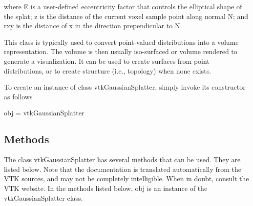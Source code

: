 where E is a user-\/defined eccentricity factor that controls the elliptical shape of the splat; z is the distance of the current voxel sample point along normal N; and rxy is the distance of x in the direction prependicular to N.

This class is typically used to convert point-\/valued distributions into a volume representation. The volume is then usually iso-\/surfaced or volume rendered to generate a visualization. It can be used to create surfaces from point distributions, or to create structure (i.\-e., topology) when none exists.

To create an instance of class vtk\-Gaussian\-Splatter, simply invoke its constructor as follows \begin{DoxyVerb}  obj = vtkGaussianSplatter
\end{DoxyVerb}
 \hypertarget{vtkwidgets_vtkxyplotwidget_Methods}{}\subsection{Methods}\label{vtkwidgets_vtkxyplotwidget_Methods}
The class vtk\-Gaussian\-Splatter has several methods that can be used. They are listed below. Note that the documentation is translated automatically from the V\-T\-K sources, and may not be completely intelligible. When in doubt, consult the V\-T\-K website. In the methods listed below, {\ttfamily obj} is an instance of the vtk\-Gaussian\-Splatter class. 
